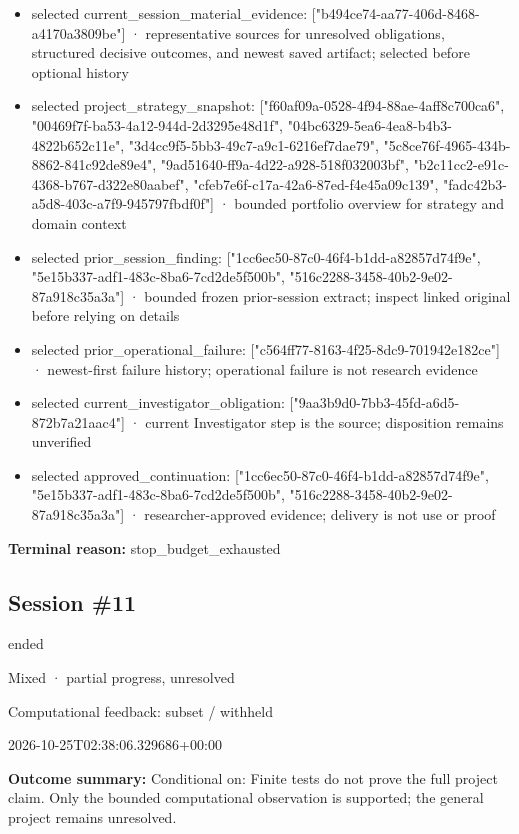 \documentclass[11pt]{article}
\begin{document}
\begin{itemize}
\item selected current\_session\_material\_evidence: ["b494ce74-aa77-406d-8468-a4170a3809be"] · representative sources for unresolved obligations, structured decisive outcomes, and newest saved artifact; selected before optional history
\item selected project\_strategy\_snapshot: ["f60af09a-0528-4f94-88ae-4aff8c700ca6", "00469f7f-ba53-4a12-944d-2d3295e48d1f", "04bc6329-5ea6-4ea8-b4b3-4822b652c11e", "3d4cc9f5-5bb3-49c7-a9c1-6216ef7dae79", "5c8ce76f-4965-434b-8862-841c92de89e4", "9ad51640-ff9a-4d22-a928-518f032003bf", "b2c11cc2-e91c-4368-b767-d322e80aabef", "cfeb7e6f-c17a-42a6-87ed-f4e45a09c139", "fadc42b3-a5d8-403c-a7f9-945797fbdf0f"] · bounded portfolio overview for strategy and domain context
\item selected prior\_session\_finding: ["1cc6ec50-87c0-46f4-b1dd-a82857d74f9e", "5e15b337-adf1-483c-8ba6-7cd2de5f500b", "516c2288-3458-40b2-9e02-87a918c35a3a"] · bounded frozen prior-session extract; inspect linked original before relying on details
\item selected prior\_operational\_failure: ["c564ff77-8163-4f25-8dc9-701942e182ce"] · newest-first failure history; operational failure is not research evidence
\item selected current\_investigator\_obligation: ["9aa3b9d0-7bb3-45fd-a6d5-872b7a21aac4"] · current Investigator step is the source; disposition remains unverified
\item selected approved\_continuation: ["1cc6ec50-87c0-46f4-b1dd-a82857d74f9e", "5e15b337-adf1-483c-8ba6-7cd2de5f500b", "516c2288-3458-40b2-9e02-87a918c35a3a"] · researcher-approved evidence; delivery is not use or proof
\end{itemize}
\textbf{Terminal reason:} stop\_budget\_exhausted\par
\subsection{Session \#11}
\begin{description}[style=nextline,font=\normalfont\bfseries,leftmargin=0pt,labelsep=0pt]
\item[Execution status] ended
\item[Outcome] Mixed · partial progress, unresolved
\item[Strategy] Computational feedback: subset / withheld
\item[Started] 2026-10-25T02:38:06.329686+00:00
\end{description}
\textbf{Outcome summary:} Conditional on: Finite tests do not prove the full project claim. Only the bounded computational observation is supported; the general project remains unresolved.\par
\end{document}
